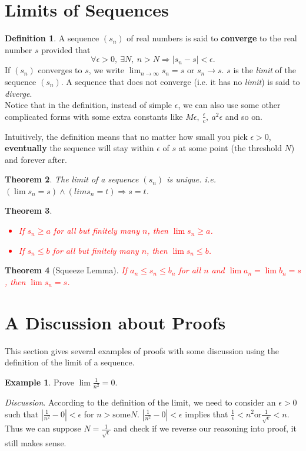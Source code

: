\documentclass[12pt, lettersize]{book}
\theoremstyle{plain}
\newtheorem{thm}{Theorem}[section]
\theoremstyle{definition}
\newtheorem{dfn}[thm]{Definition}
\newtheorem*{eg}{Example}
\theoremstyle{remark}
\begin{document}
	\section{Limits of Sequences}		
	\begin{dfn}\label{def:limit}
		A sequence $(s_n)$ of real numbers is said to \textbf{converge} to the real number \emph{$s$} provided that
		\begin{displaymath}
			\forall \epsilon > 0,\ \exists N,\ n > N \Rightarrow |s_n-s| < \epsilon.
		\end{displaymath}
		If $(s_n)$ converges to $s$, we write $\lim_{n\rightarrow \infty}s_n=s$ or $s_n\rightarrow s$. $s$ is the \emph{limit} of the sequence $(s_n)$.
		A sequence that does not converge (i.e. it has no \emph{limit}) is said to \emph{diverge}.\\
		Notice that in the definition, instead of simple $\epsilon$, we can also use some other complicated forms with some extra constants like $M\epsilon,\ \frac{\epsilon}{c},\ a^2\epsilon$ and so on.
	\end{dfn}
	
	Intuitively, the definition means that no matter how small you pick $\epsilon>0$, \textbf{eventually} the sequence will stay within $\epsilon$ of $s$ at some point (the threshold $N$) and forever after.
	
	\begin{thm}
		The limit of a sequence $(s_n)$ is unique. i.e. $(\lim s_n=s) \land (lim s_n=t) \Rightarrow s=t$.
	\end{thm}
	
	\begin{thm}
		\textcolor{red}{
			\begin{itemize}
				\item If $s_n\geq a$ for all but finitely many $n$, then $\lim s_n\geq a$.
				\item If $s_n\leq b$ for all but finitely many $n$, then $\lim s_n\leq b$.
		\end{itemize}}
	\end{thm}
	
	\begin{thm}[Squeeze Lemma]\label{lem: squeeze}
		\textcolor{red}{If $a_n\leq s_n\leq b_n$ for all $n$ and $\lim a_n=\lim b_n=s$, then $\lim s_n=s$.}
	\end{thm}
	
	\newpage
	
	\section{A Discussion about Proofs}
	This section gives several examples of proofs with some discussion using the definition of the limit of a sequence.
	\begin{eg}
		Prove $\lim \frac{1}{n^2}=0$.
	\end{eg}
	\emph{Discussion}. According to the definition of the limit, we need to consider an $\epsilon >0$ such that $|\frac{1}{n^2}-0|<\epsilon$ for $n>\text{some}N$.
	$|\frac{1}{n^2}-0|<\epsilon$ implies that $\frac{1}{\epsilon}<n^2 \text{or} \frac{1}{\sqrt{\epsilon}}<n$.
	Thus we can suppose $N=\frac{1}{\sqrt{\epsilon}}$ and check if we reverse our reasoning into proof, it still makes sense. 
	
\end{document}
